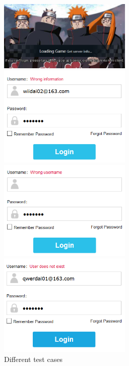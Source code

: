 \documentclass[12pt,a4paper,bibliography=totocnumbered,listof=totocnumbered]{article}
\begin{document}
	\begin{figure}[H] 
		\begin{minipage}[t]{0.5\linewidth} 
		\centering 
		\includegraphics[width=2.5in]{pics/login01.png}  
		\end{minipage}%
		\begin{minipage}[t]{0.5\linewidth} 
		\centering 
		\includegraphics[width=2.5in]{pics/login02.png} 
		\end{minipage} %
		\begin{minipage}[t]{0.5\linewidth} 
		\centering 
		\includegraphics[width=2.5in]{pics/login03.png} 
		\end{minipage} %
		\begin{minipage}[t]{0.5\linewidth} 
		\centering 
		\includegraphics[width=2.5in]{pics/login04.png} 
		\end{minipage} %
		\caption{Different test cases}
		\label{fig:login01}
	\end{figure} %
\end{document}
